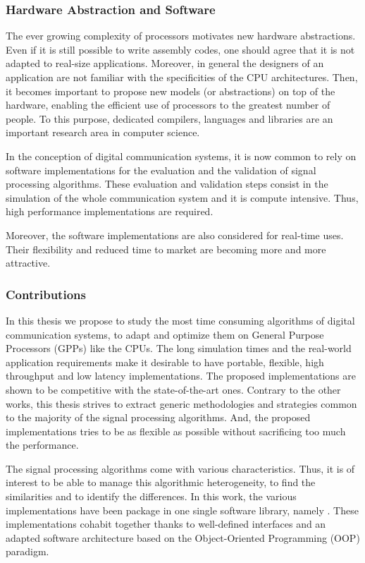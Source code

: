 \subsubsection*{Hardware Abstraction and Software}

The ever growing complexity of processors motivates new hardware abstractions.
Even if it is still possible to write assembly codes, one should agree that it
is not adapted to real-size applications. Moreover, in general the designers of
an application are not familiar with the specificities of the CPU architectures.
Then, it becomes important to propose new models (or abstractions) on top of the
hardware, enabling the efficient use of processors to the greatest number of
people. To this purpose, dedicated compilers, languages and libraries are an
important research area in computer science.

In the conception of digital communication systems, it is now common to rely on
software implementations for the evaluation and the validation of signal
processing algorithms. These evaluation and validation steps consist in
the simulation of the whole communication system and it is compute intensive.
Thus, high performance implementations are required.

Moreover, the software implementations are also considered for real-time uses.
Their flexibility and reduced time to market are becoming more and more
attractive.

\subsubsection*{Contributions}

In this thesis we propose to study the most time consuming algorithms of digital
communication systems, to adapt and optimize them on General Purpose Processors
(GPPs) like the CPUs. The long simulation times and the real-world application
requirements make it desirable to have portable, flexible, high throughput and
low latency implementations. The proposed implementations are shown to be
competitive with the state-of-the-art ones. Contrary to the other works, this
thesis strives to extract generic methodologies and strategies common to the
majority of the signal processing algorithms. And, the proposed implementations
tries to be as flexible as possible without sacrificing too much the
performance.

The signal processing algorithms come with various characteristics. Thus, it is
of interest to be able to manage this algorithmic heterogeneity, to find the
similarities and to identify the differences. In this work, the various
implementations have been package in one single software library, namely
\AFFECT. These implementations cohabit together thanks to well-defined
interfaces and an adapted software architecture based on the Object-Oriented
Programming (OOP) paradigm.

